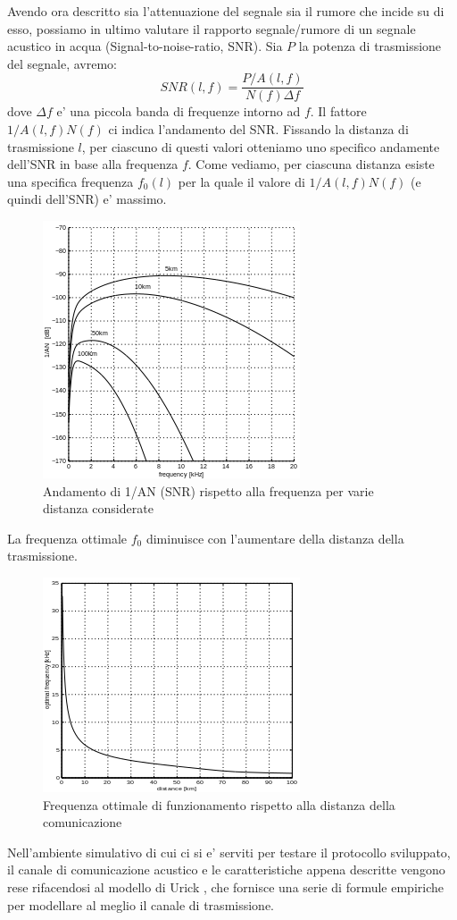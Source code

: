 \documentclass[Lau,binding=0.6cm]{sapthesis}
\begin{document}
Avendo ora descritto sia l'attenuazione del segnale sia il rumore che incide su di esso, possiamo in ultimo valutare il rapporto segnale/rumore di un segnale acustico in acqua (Signal-to-noise-ratio, SNR).
Sia $P$ la potenza di trasmissione del segnale, avremo:
\[SNR(l, f) = \frac{P/A(l, f)}{N(f)\Delta f}\]
dove $\Delta f $ e' una piccola banda di frequenze intorno ad $f$. Il fattore $1/A(l, f)N(f)$ ci indica l'andamento del SNR. Fissando la distanza di trasmissione $l$, per ciascuno di questi valori otteniamo uno specifico andamente dell'SNR in base alla frequenza $f$. Come vediamo, per ciascuna distanza esiste una specifica frequenza $f_0(l)$ per la quale il valore di $1/A(l, f)N(f)$ (e quindi dell'SNR) e' massimo.
\begin{figure}[H]
\centering
    \includegraphics[]{snr.png}
    \caption{Andamento di 1/AN (SNR) rispetto alla frequenza per varie distanza considerate}
\end{figure}

La frequenza ottimale $f_0$ diminuisce con l'aumentare della distanza della trasmissione.
\begin{figure}[H]
    \centering
    \includegraphics[]{optimalfreq.png}
    \caption{Frequenza ottimale di funzionamento rispetto alla distanza della comunicazione}
\end{figure}
\par
Nell'ambiente simulativo di cui ci si e' serviti per testare il protocollo sviluppato, il canale di comunicazione acustico e le caratteristiche appena descritte vengono rese rifacendosi al modello di Urick \cite{urick}, che fornisce una serie di formule empiriche per modellare al meglio il canale di trasmissione.
\end{document}
